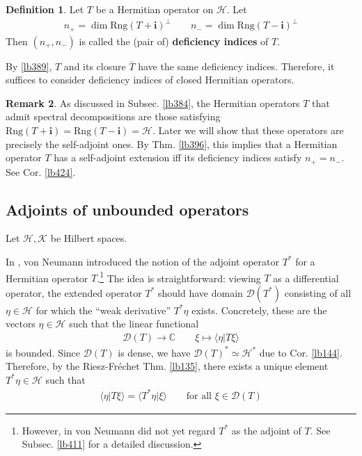 \documentclass[12pt,b5paper,notitlepage]{article}
\theoremstyle{definition}
\newtheorem{df}{Definition}[subsection]
\newtheorem{rem}[df]{Remark}
\theoremstyle{plain}
\newcommand{\ovl}{\overline}
\newcommand{\Dom}{\mathscr{D}}
\newcommand{\bk}[1]{\langle {#1}\rangle}
\newcommand{\im}{\mathbf{i}}
\newcommand{\Cbb}{\mathbb C}
\newcommand{\Rng}{\mathrm{Rng}}
\newcommand{\MH}{\mathcal H}
\newcommand{\MK}{\mathcal K}
\numberwithin{equation}{section}
\begin{document}
\begin{df}
Let $T$ be a Hermitian operator on $\MH$. Let
\begin{align*}
n_+=\dim \Rng(T+\im)^\perp\qquad n_-=\dim\Rng(T-\im)^\perp
\end{align*}
Then $(n_+,n_-)$ is called the (pair of) \textbf{deficiency indices}  of $T$. 
\end{df}

By \ref{lb389}, $T$ and its closure $\ovl T$ have the same deficiency indices. Therefore, it suffices to consider deficiency indices of closed Hermitian operators.


\begin{rem}
As discussed in Subsec. \ref{lb384}, the Hermitian operators $T$ that admit spectral decompositions are those satisfying $\Rng(T+\im)=\Rng(T-\im)=\MH$. Later we will show that these operators are precisely the self-adjoint ones. By Thm. \ref{lb396}, this implies that a Hermitian operator $T$ has a self-adjoint extension iff its deficiency indices satisfy $n_+=n_-$. See Cor. \ref{lb424}.
\end{rem} 



\subsection{Adjoints of unbounded operators}


Let $\MH,\MK$ be Hilbert spaces.


In \cite{vN29a}, von Neumann introduced the notion of the adjoint operator $T^*$ for a Hermitian operator $T$.\footnote{However, in \cite{vN29a} von Neumann did not yet regard $T^*$ as the adjoint of $T$. See Subsec. \ref{lb411} for a detailed discussion.} The idea is straightforward: viewing $T$ as a differential operator, the extended operator $T^*$ should have domain $\Dom(T^*)$ consisting of all $\eta\in\MH$ for which the ``weak derivative'' $T^*\eta$ exists. Concretely, these are the vectors $\eta\in\MH$ such that the linear functional
\begin{align}\label{eq203}
\Dom(T)\rightarrow\Cbb\qquad \xi\mapsto\bk{\eta|T\xi}
\end{align}
is bounded. Since $\Dom(T)$ is dense, we have $\Dom(T)^*\simeq\MH^*$ due to Cor. \ref{lb144}. Therefore, by the Riesz-Fr\'echet Thm. \ref{lb135}, there exists a unique element $T^*\eta\in\MH$ such that
\begin{align*}
\bk{\eta|T\xi}=\bk{T^*\eta|\xi}\qquad\text{for all }\xi\in\Dom(T)
\end{align*}
\end{document}
